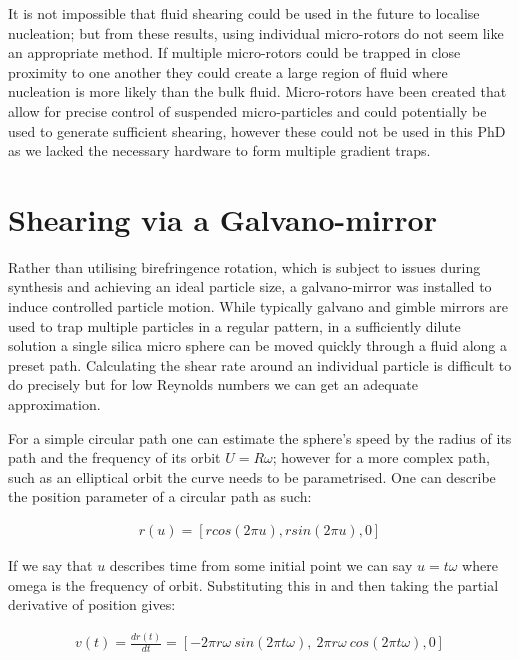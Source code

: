 It is not impossible that fluid shearing could be used in the future to localise
nucleation; but from these results, using individual micro-rotors do not seem like 
an appropriate method. If multiple micro-rotors could be trapped in close proximity 
to one another they could create a large region of fluid where nucleation is more 
likely than the bulk fluid. Micro-rotors have been created that allow for precise
control of suspended micro-particles \cite{Butaite2019} and could potentially be
used to generate sufficient shearing, however these could not be used in this PhD 
as we lacked the necessary hardware to form multiple gradient traps.  


\section{Shearing via a Galvano-mirror}
Rather than utilising birefringence rotation, which is subject to issues
during synthesis and achieving an ideal particle size, a galvano-mirror
was installed to induce controlled particle motion. While typically 
galvano and gimble mirrors are used to trap multiple particles in a 
regular pattern, in a sufficiently dilute solution a single silica 
micro sphere can be moved quickly through a fluid along a preset path.
Calculating the shear rate around an individual particle is difficult to
do precisely but for low Reynolds numbers we can get an adequate approximation.

For a simple circular path one can estimate the sphere's speed by the 
radius of its path and the frequency of its orbit $U = R\omega$; however 
for a more complex path, such as an elliptical orbit the curve needs 
to be parametrised. One can describe the position parameter of a circular 
path as such:

\begin{align}
	r(u) = \left[rcos(2\pi u), rsin(2\pi u), 0 \right]
\end{align}

If we say that $u$ describes time from some initial point we can say $u=t\omega$ 
where omega is the frequency of orbit. Substituting this in and then taking 
the partial derivative of position gives:

\begin{align}
	v(t) = \frac{dr(t)}{dt} = \left[-2\pi r\omega \ sin(2\pi t\omega),
	\ 2\pi r\omega \ cos(2\pi t\omega), 0 \right]
\end{align}

